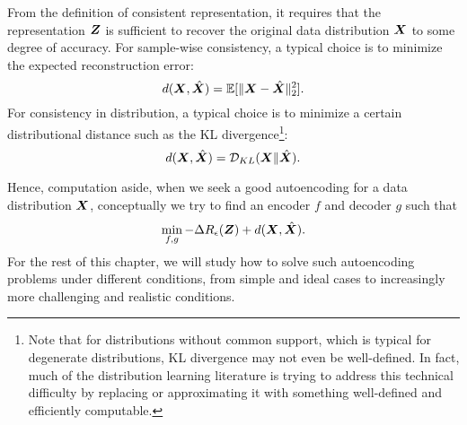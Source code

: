 \documentclass[../../book-main.tex]{subfiles}
\begin{document}
From the definition of consistent representation, it requires that
the representation $\bm{Z}$ is sufficient to recover the original data
distribution $\bm{X}$ to some degree of accuracy. For sample-wise
consistency, a typical choice is to minimize the expected reconstruction error:
\begin{equation}
  d(\bm{X}, \hat {\bm{X}}) = \mathbb{E}[\|\bm{X} - \hat{\bm{X}}\|_2^2].
\end{equation}
For consistency in distribution, a typical choice is to minimize a
certain distributional distance such as the KL
divergence\footnote{Note that for distributions without common
  support, which is typical for degenerate distributions, KL divergence
  may not even be well-defined. In fact, much of the distribution
  learning literature is trying to address this technical difficulty by
  replacing or approximating it with something well-defined and
efficiently computable.}:
\begin{equation}
  d(\bm{X}, \hat {\bm{X}}) = \mathcal{D}_{KL}(\bm{X}\|\hat{\bm{X}}).
\end{equation}

Hence, computation aside, when we seek a good autoencoding for a data
distribution $\bm{X}$,  conceptually we try to find an encoder $f$ and
decoder $g$ such that
\begin{equation}
  \min_{f, g} - \Delta R_{\epsilon}(\bm{Z}) + d(\bm{X}, \hat {\bm{X}}).
  \label{eqn:autoencode-objective-ch5}
\end{equation}
For the rest of this chapter, we will study how to solve such
autoencoding problems under different conditions, from simple and
ideal cases to increasingly more challenging and realistic conditions.

\end{document}
